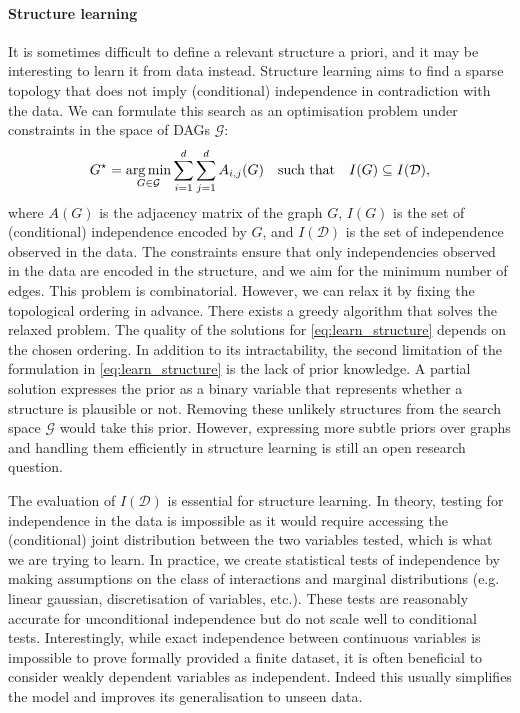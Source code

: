\paragraph{Structure learning}
It is sometimes difficult to define a relevant structure a priori, and it may be interesting to learn it from data instead. Structure learning aims to find a sparse topology that does not imply (conditional) independence in contradiction with the data. We can formulate this search as an optimisation problem under constraints in the space of DAGs $\mathcal{G}$:
\begin{align}
 G^\star = \operatorname*{arg\,min}_{G \in \mathcal{G}} \sum_{i=1}^d\sum_{j=1}^d A_{i,j}(G) \quad \text{such that} \quad I(G) \subseteq I(\mathcal{D}), \label{eq:learn_structure}
\end{align}
where $A(G)$ is the adjacency matrix of the graph $G$, $I(G)$ is the set of (conditional) independence encoded by $G$, and $I(\mathcal{D})$ is the set of independence observed in the data. The constraints ensure that only independencies observed in the data are encoded in the structure, and we aim for the minimum number of edges. This problem is combinatorial. However, we can relax it by fixing the topological ordering in advance. There exists a greedy algorithm that solves the relaxed problem. The quality of the solutions for \eqref{eq:learn_structure} depends on the chosen ordering. In addition to its intractability, the second limitation of the formulation in \eqref{eq:learn_structure} is the lack of prior knowledge. A partial solution expresses the prior as a binary variable that represents whether a structure is plausible or not. Removing these unlikely structures from the search space $\mathcal{G}$ would take this prior. However, expressing more subtle priors over graphs and handling them efficiently in structure learning is still an open research question.

The evaluation of $I(\mathcal{D})$ is essential for structure learning. In theory, testing for independence in the data is impossible as it would require accessing the (conditional) joint distribution between the two variables tested, which is what we are trying to learn. In practice, we create statistical tests of independence by making assumptions on the class of interactions and marginal distributions (e.g. linear gaussian, discretisation of variables, etc.). These tests are reasonably accurate for unconditional independence but do not scale well to conditional tests. Interestingly, while exact independence between continuous variables is impossible to prove formally provided a finite dataset, it is often beneficial to consider weakly dependent variables as independent. Indeed this usually simplifies the model and improves its generalisation to unseen data.

